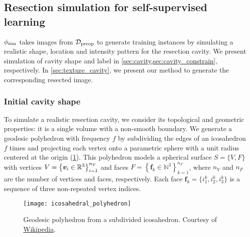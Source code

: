 \subsection{Resection simulation for self-supervised learning}
\label{sec:simulation}

\newcommand{\AAA}{\bm{A}}
\newcommand{\NN}{\mathcal{N}}


$\phi_{\text{sim}}$ takes images from $\mathcal{D}_{\text{preop}}$ to generate training instances by simulating a realistic shape, location and intensity pattern for the resection cavity.
We present simulation of cavity shape and label in \cref{sec:cavity,sec:cavity_constrain}, respectively.
In \cref{sec:texture_cavity}, we present our method to generate the corresponding resected image.


\subsubsection{Initial cavity shape}
\label{sec:cavity}

To simulate a realistic resection cavity, we consider its topological and geometric properties: it is a single volume with a non-smooth boundary.
We generate a geodesic polyhedron with frequency $f$ by subdividing the edges of an icosahedron $f$ times and projecting each vertex onto a parametric sphere with a unit radius centered at the origin (\cref{fig:icosahedron}).
This polyhedron models a spherical surface $S = \{ V, F \}$ with vertices
$
  V = \left\{
    \bm{v}_i \in \mathbb{R}^3
  \right\}
  _{i = 1}^{n_V}
$
and faces
$
  F = \left\{
    \bm{f}_k \in \mathbb{N}^3
  \right\}
  _{k = 1}^{n_F}
$, where $n_V$ and $n_F$ are the number of vertices and faces, respectively.
%
Each face $\bm{f}_k = \{ i_1^k, i_2^k, i_3^k \}$ is a sequence of three non-repeated vertex indices.

\begin{figure}
  \centering
  \texttt{[image: icosahedral\_polyhedron]}
  \caption[Geodesic polyhedron from a subdivided icosahedron]{
    Geodesic polyhedron from a subdivided icosahedron.
    Courtesy of \href{https://en.wikipedia.org/wiki/Geodesic_polyhedron}{Wikipedia}.
  }
  \label{fig:icosahedron}
\end{figure}

